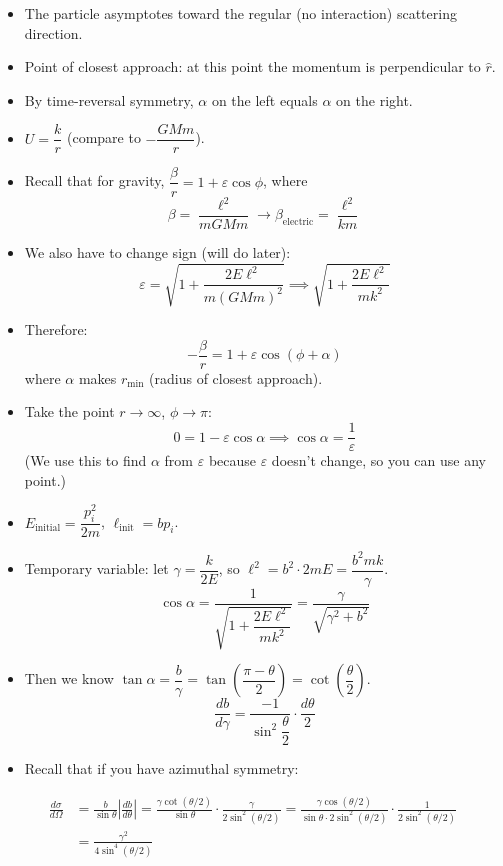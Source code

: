 \begin{itemize}
    \item The particle asymptotes toward the regular (no interaction) scattering direction.
    \item Point of closest approach: at this point the momentum is perpendicular to $\hat{r}$.
    \item By time-reversal symmetry, $\alpha$ on the left equals $\alpha$ on the right.
    \item $U = \dfrac{k}{r}$ (compare to $-\dfrac{GMm}{r}$).
    \item Recall that for gravity, $\dfrac{\beta}{r} = 1 + \varepsilon\cos\phi$, where
    \[
        \beta = \frac{\ell^2}{mGMm} \longrightarrow \beta_{\text{electric}} = \frac{\ell^2}{km}
    \]
    \item We also have to change sign (will do later):
    \[
        \varepsilon = \sqrt{1 + \frac{2E\ell^2}{m(GMm)^2}} \implies \sqrt{1 + \frac{2E\ell^2}{mk^2}}
    \]
    \item Therefore:
    \[
        -\frac{\beta}{r} = 1 + \varepsilon\cos(\phi + \alpha)
    \]
    where $\alpha$ makes $r_{\min}$ (radius of closest approach).
    \item Take the point $r\to\infty$, $\phi\to\pi$:
    \[
        0 = 1 - \varepsilon\cos\alpha \implies \cos\alpha = \frac{1}{\varepsilon}
    \]
    (We use this to find $\alpha$ from $\varepsilon$ because $\varepsilon$ doesn't change, so you can use any point.)
    \item $E_{\text{initial}} = \dfrac{p_i^2}{2m}$, $\ell_{\text{init}} = bp_i$.
    \item Temporary variable: let $\gamma = \dfrac{k}{2E}$, so $\ell^2 = b^2\cdot 2mE = \dfrac{b^2 mk}{\gamma}$.
    \[
        \cos\alpha = \frac{1}{\sqrt{1 + \dfrac{2E\ell^2}{mk^2}}} = \frac{\gamma}{\sqrt{\gamma^2 + b^2}}
    \]
    \item Then we know $\tan\alpha = \dfrac{b}{\gamma} = \tan\!\left(\dfrac{\pi-\theta}{2}\right) = \cot\!\left(\dfrac{\theta}{2}\right)$.
    \[
        \frac{db}{d\gamma} = \frac{-1}{\sin^2\!\dfrac{\theta}{2}}\cdot\frac{d\theta}{2}
    \]
    \item Recall that if you have azimuthal symmetry:
\end{itemize}

\begin{align*}
    \frac{d\sigma}{d\Omega}
    &= \frac{b}{\sin\theta}\left|\frac{db}{d\theta}\right|
    = \frac{\gamma\cot(\theta/2)}{\sin\theta}\cdot\frac{\gamma}{2\sin^2(\theta/2)}
    = \frac{\gamma\cos(\theta/2)}{\sin\theta\cdot 2\sin^2(\theta/2)} \cdot \frac{1}{2\sin^2(\theta/2)}\\
    &= \frac{\gamma^2}{4\sin^4(\theta/2)}
\end{align*}

